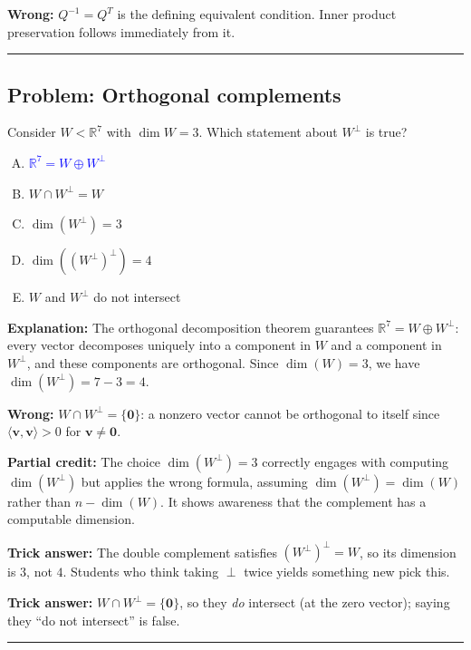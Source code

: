 \documentclass[12pt]{amsart}
\newcommand{\divider}{
  \vspace{-1em}
  \noindent
  \raisebox{-0.15ex}{\textbullet}%
  \hspace{0.5em}%
  \rule[0.5ex]{0.95\textwidth}{1.0pt}%
  \hspace{0.5em}%
  \raisebox{-0.15ex}{\textbullet}%
  \vspace{0em}
}
\begin{document}
\textbf{Wrong:}
$Q^{-1} = Q^T$ is the defining equivalent condition.
Inner product preservation follows immediately from it.

\divider

\subsection*{Problem: Orthogonal complements}

Consider $W < \mathbb{R}^7$ with $\dim W = 3$.
Which statement about $W^\perp$ is true?

\begin{enumerate}[(A)]
\item \textcolor{blue}{\textbf{$\mathbb{R}^7 = W \oplus W^\perp$}}
\item $W \cap W^\perp = W$
\item $\dim(W^\perp) = 3$
\item $\dim\left((W^\perp)^\perp\right) = 4$
\item $W$ and $W^\perp$ do not intersect
\end{enumerate}

\textbf{Explanation:}
The orthogonal decomposition theorem guarantees $\mathbb{R}^7 = W \oplus W^\perp$:
every vector decomposes uniquely into a component in $W$ and a component in
$W^\perp$, and these components are orthogonal.
Since $\dim(W) = 3$, we have $\dim(W^\perp) = 7-3=4$.

\textbf{Wrong:}
$W \cap W^\perp = \{\mathbf{0}\}$: a nonzero vector cannot be orthogonal to itself
since $\langle\mathbf{v},\mathbf{v}\rangle > 0$ for $\mathbf{v}\neq\mathbf{0}$.

\textbf{Partial credit:}
The choice $\dim(W^\perp) = 3$ correctly engages with computing $\dim(W^\perp)$
but applies the wrong formula, assuming $\dim(W^\perp) = \dim(W)$ rather than
$n - \dim(W)$.
It shows awareness that the complement has a computable dimension.

\textbf{Trick answer:}
The double complement satisfies $(W^\perp)^\perp = W$, so its dimension is $3$,
not $4$.
Students who think taking $\perp$ twice yields something new pick this.

\textbf{Trick answer:}
$W\cap W^\perp = \{\mathbf{0}\}$, so they \emph{do} intersect (at the zero vector);
saying they ``do not intersect'' is false.

\divider

\end{document}
